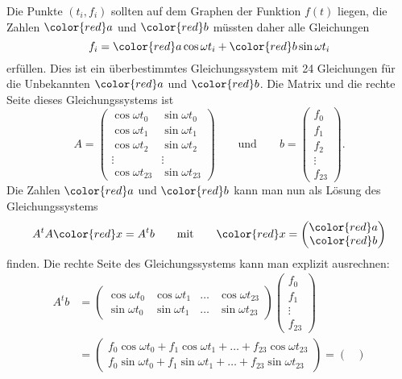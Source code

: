 \begin{loesung}
Die Punkte $(t_i,f_i)$ sollten auf dem Graphen der Funktion $f(t)$ liegen,
die Zahlen $\color{red}a$ und $\color{red}b$ müssten daher alle Gleichungen
\[
f_i = {\color{red}a}\cos\omega t_i + {\color{red}b} \sin\omega t_i
\]
erfüllen.
Dies ist ein überbestimmtes Gleichungssystem mit 24 Gleichungen für 
die Unbekannten $\color{red}a$ und $\color{red}b$.
Die Matrix und die rechte Seite dieses Gleichungssystems ist
\[
A
=
\begin{pmatrix}
\cos \omega t_0&\sin\omega t_0\\
\cos \omega t_1&\sin\omega t_1\\
\cos \omega t_2&\sin\omega t_2\\
\vdots         &\vdots        \\
\cos \omega t_{23}&\sin\omega t_{23}
\end{pmatrix}
\qquad
\text{und}
\qquad
b
=
\begin{pmatrix}
f_0\\
f_1\\
f_2\\
\vdots\\
f_{23}
\end{pmatrix}.
\]
Die Zahlen $\color{red}a$ und $\color{red}b$ kann man nun als Lösung
des Gleichungssystems
\[
A^tA{\color{red}x}=A^tb
\qquad\text{mit}\qquad
{\color{red}x}
=
\begin{pmatrix}
\color{red}a\\
\color{red}b
\end{pmatrix}
\]
finden.
Die rechte Seite des Gleichungssystems kann man explizit ausrechnen:
\begin{align*}
A^tb
&=
\begin{pmatrix}
\cos\omega t_0&\cos\omega t_1&\dots&\cos\omega t_{23}\\
\sin\omega t_0&\sin\omega t_1&\dots&\sin\omega t_{23}
\end{pmatrix}
\begin{pmatrix}
f_0\\f_1\\\vdots\\f_{23}
\end{pmatrix}
\\
&=
\begin{pmatrix}
f_0\cos\omega t_0 + f_1\cos\omega t_1+\dots+f_{23}\cos\omega t_{23}\\
f_0\sin\omega t_0 + f_1\sin\omega t_1+\dots+f_{23}\sin\omega t_{23}
\end{pmatrix}
=
\begin{pmatrix}

\end{pmatrix}
\end{align*}
\end{loesung}

